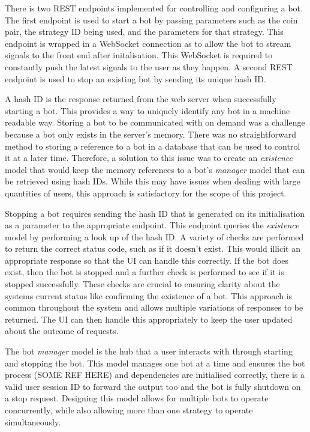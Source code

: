 \noindent There is two REST endpoints implemented for controlling and configuring a bot. The first endpoint is used to start a bot by passing parameters such as the coin pair, the strategy ID being used, and the parameters for that strategy. This endpoint is wrapped in a WebSocket connection as to allow the bot to stream signals to the front end after initalisation. This WebSocket is required to constantly push the latest signals to the user as they happen. A second REST endpoint is used to stop an existing bot by sending its unique hash ID.

A hash ID is the response returned from the web server when successfully starting a bot. This provides a way to uniquely identify any bot in a machine readable way. Storing a bot to be communicated with on demand was a challenge because a bot only exists in the server's memory. There was no straightforward method to storing a reference to a bot in a database that can be used to control it at a later time. Therefore, a solution to this issue was to create an \textit{existence} model that would keep the memory references to a bot's \textit{manager} model that can be retrieved using hash IDs. While this may have issues when dealing with large quantities of users, this approach is satisfactory for the scope of this project. 

Stopping a bot requires sending the hash ID that is generated on its initialisation as a parameter to the appropriate endpoint. This endpoint queries the \textit{existence} model by performing a look up of the hash ID. A variety of checks are performed to return the correct status code, such as if it doesn't exist.  This would illicit an appropriate response so that the UI can handle this correctly. If the bot does exist, then the bot is stopped and a further check is performed to see if it is stopped successfully. These checks are crucial to ensuring clarity about the systems current status like confirming the existence of a bot. This approach is common throughout the system and allows multiple variations of responses to be returned. The UI can then handle this appropriately to keep the user updated about the outcome of requests.

The bot \textit{manager} model is the hub that a user interacts with through starting and stopping the bot. This model manages one bot at a time and ensures the bot process (SOME REF HERE) and dependencies are initialised correctly, there is a valid user session ID to forward the output too and the bot is fully shutdown on a stop request. Designing this model allows for multiple bots to operate concurrently, while also allowing more than one strategy to operate simultaneously.


